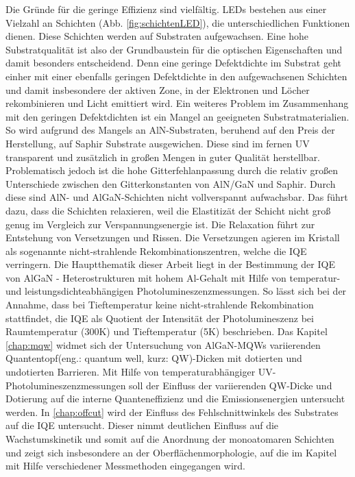 Die Gründe für die geringe Effizienz sind vielfältig. LEDs bestehen aus einer Vielzahl an Schichten (Abb. \ref{fig:schichtenLED}), die unterschiedlichen Funktionen dienen. Diese Schichten werden auf Substraten aufgewachsen. Eine hohe Substratqualität ist also der Grundbaustein für die optischen Eigenschaften und damit besonders entscheidend. Denn eine geringe Defektdichte im Substrat geht einher mit einer ebenfalls geringen Defektdichte in den aufgewachsenen Schichten und damit insbesondere der aktiven Zone, in der Elektronen und Löcher rekombinieren und Licht emittiert wird. Ein weiteres Problem im Zusammenhang mit den geringen Defektdichten ist ein Mangel an geeigneten Substratmaterialien. So wird aufgrund des Mangels an AlN-Substraten, beruhend auf den Preis der Herstellung, auf Saphir Substrate ausgewichen. Diese sind im fernen UV transparent und zusätzlich in großen Mengen in guter Qualität herstellbar. Problematisch jedoch ist die hohe Gitterfehlanpassung durch die relativ großen Unterschiede zwischen den Gitterkonstanten von AlN/GaN und Saphir. Durch diese sind AlN- und AlGaN-Schichten nicht vollverspannt aufwachsbar. Das führt dazu, dass die Schichten relaxieren, weil die Elastitizät der Schicht nicht groß genug im Vergleich zur Verspannungsenergie ist. Die Relaxation führt zur Entstehung von Versetzungen und Rissen. Die Versetzungen agieren im Kristall als sogenannte nicht-strahlende Rekombinationszentren, welche die IQE verringern. Die Hauptthematik dieser Arbeit liegt in der Bestimmung der IQE von AlGaN - Heterostrukturen mit hohem Al-Gehalt mit Hilfe von temperatur- und leistungsdichteabhängigen Photolumineszenzmessungen.
So lässt sich bei der Annahme, dass bei Tieftemperatur keine nicht-strahlende Rekombination stattfindet, die IQE als Quotient der Intensität der Photolumineszenz bei Raumtemperatur (300K) und Tieftemperatur (5K) beschrieben.  
Das Kapitel \ref{chap:mqw} widmet sich der Untersuchung von AlGaN-MQWs variierenden Quantentopf(eng.: quantum well, kurz: QW)-Dicken mit dotierten und undotierten Barrieren. Mit Hilfe von temperaturabhängiger UV-Photolumineszenzmessungen soll der Einfluss der variierenden QW-Dicke und Dotierung auf die interne Quanteneffizienz und die Emissionsenergien untersucht werden. 
In \ref{chap:offcut} wird der Einfluss des Fehlschnittwinkels des Substrates auf die IQE untersucht. Dieser nimmt deutlichen Einfluss auf die Wachstumskinetik und somit auf die Anordnung der monoatomaren Schichten und zeigt sich insbesondere an der Oberflächenmorphologie, auf die im Kapitel mit Hilfe verschiedener Messmethoden eingegangen wird.
